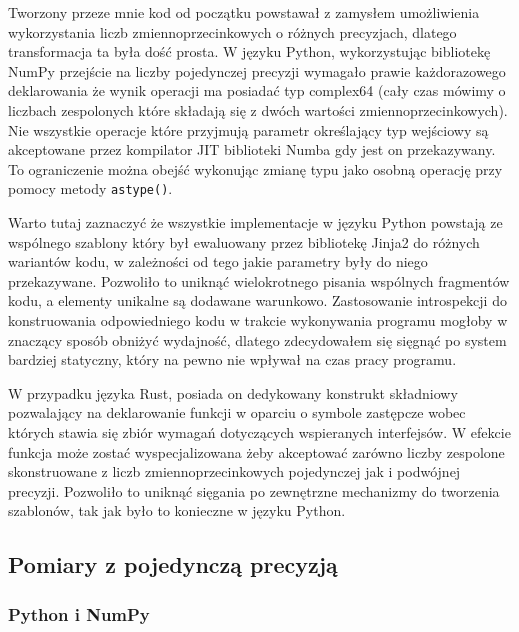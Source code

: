 \documentclass[11pt, a4paper]{article}
\newcommand{\code}[1]{\texttt{#1}}
\begin{document}
\begin{sloppypar}
    Tworzony przeze mnie kod od początku powstawał z zamysłem umożliwienia wykorzystania
    liczb zmiennoprzecinkowych o różnych precyzjach, dlatego transformacja ta była dość
    prosta. W języku Python, wykorzystując bibliotekę NumPy przejście na liczby
    pojedynczej precyzji wymagało prawie każdorazowego deklarowania że wynik operacji ma
    posiadać typ complex64 (cały czas mówimy o liczbach zespolonych które składają się z
    dwóch wartości zmiennoprzecinkowych). Nie wszystkie operacje które przyjmują parametr
    określający typ wejściowy są akceptowane przez kompilator JIT biblioteki Numba gdy jest
    on przekazywany. To ograniczenie można obejść wykonując zmianę typu jako osobną
    operację przy pomocy metody \code{astype()}.

    Warto tutaj zaznaczyć że wszystkie implementacje w języku Python powstają ze wspólnego
    szablony który był ewaluowany przez bibliotekę Jinja2 do różnych wariantów kodu, w
    zależności od tego jakie parametry były do niego przekazywane. Pozwoliło to uniknąć wielokrotnego
    pisania wspólnych fragmentów kodu, a elementy unikalne są dodawane warunkowo. Zastosowanie
    introspekcji do konstruowania odpowiedniego kodu w trakcie wykonywania programu mogłoby
    w znaczący sposób obniżyć wydajność, dlatego zdecydowałem się sięgnąć po system
    bardziej statyczny, który na pewno nie wpływał na czas pracy programu.

    W przypadku języka Rust, posiada on dedykowany konstrukt składniowy pozwalający na
    deklarowanie funkcji w oparciu o symbole zastępcze wobec których stawia się zbiór
    wymagań dotyczących wspieranych interfejsów. W efekcie funkcja może zostać wyspecjalizowana
    żeby akceptować zarówno liczby zespolone skonstruowane z liczb zmiennoprzecinkowych pojedynczej
    jak i podwójnej precyzji. Pozwoliło to uniknąć sięgania po zewnętrzne mechanizmy do
    tworzenia szablonów, tak jak było to konieczne w języku Python.

    \subsection{Pomiary z pojedynczą precyzją}


    \subsubsection{ Python i NumPy }



\end{sloppypar}
\end{document}
